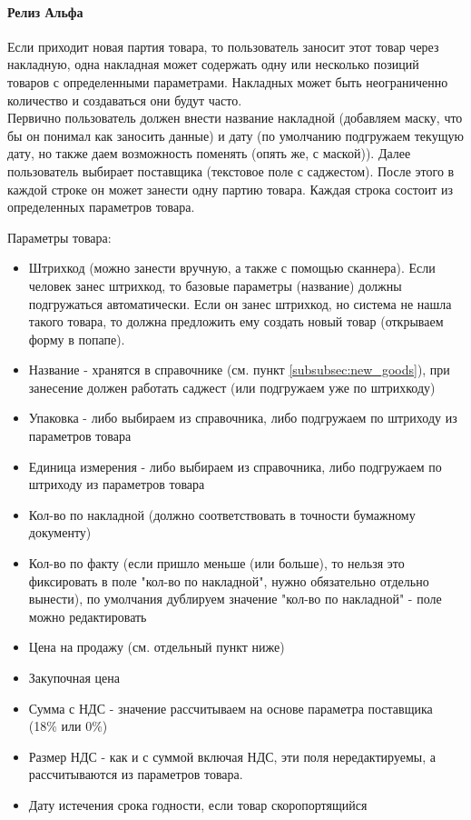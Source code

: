 \documentclass[DIV=calc, paper=a4, fontsize=11pt]{scrartcl} %
\begin{document}
\paragraph{Релиз Альфа}
Если приходит новая партия товара, то пользователь заносит этот товар через накладную, одна накладная может содержать одну или несколько позиций товаров с определенными параметрами. Накладных может быть неограниченно количество и создаваться они будут часто.
\\[0.5cm]
Первично пользователь должен внести название накладной (добавляем маску, что бы он понимал как заносить данные) и дату (по умолчанию подгружаем текущую дату, но также даем возможность поменять (опять же, с маской)). Далее пользователь выбирает поставщика (текстовое поле с саджестом). После этого в каждой строке он может занести одну партию товара. Каждая строка состоит из определенных параметров товара.

Параметры товара:

\begin{itemize}
	\item Штрихкод (можно занести вручную, а также с помощью сканнера). Если человек занес штрихкод, то базовые параметры (название) должны подгружаться автоматически. Если он занес штрихкод, но система не нашла такого товара, то должна предложить ему создать новый товар (открываем форму в попапе).
	\item Название - хранятся в справочнике (см. пункт \ref{subsubsec:new_goods}), при занесение должен работать саджест (или подгружаем уже по штрихкоду)
	\item Упаковка - либо выбираем из справочника, либо подгружаем по штриходу из параметров товара
	\item Единица измерения - либо выбираем из справочника, либо подгружаем по штриходу из параметров товара
	\item Кол-во по накладной (должно соответствовать в точности бумажному документу)
	\item Кол-во по факту (если пришло меньше (или больше), то нельзя это фиксировать в поле "кол-во по накладной", нужно обязательно отдельно вынести), по умолчания дублируем значение "кол-во по накладной" - поле можно редактировать
	\item Цена на продажу (см. отдельный пункт ниже)
	\item Закупочная цена
	\item Сумма с НДС - значение рассчитываем на основе параметра поставщика (18\% или 0\%)
	\item Размер НДС - как и с суммой включая НДС, эти поля нередактируемы, а рассчитываются из параметров товара.
	\item Дату истечения срока годности, если товар скоропортящийся
\end{itemize}
\end{document}
